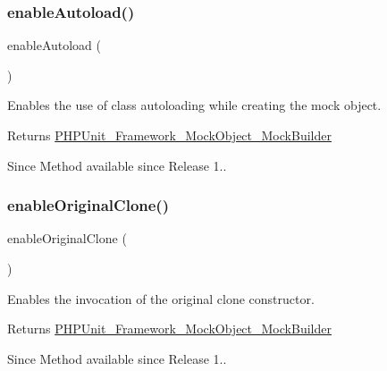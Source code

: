 \subsubsection{\texorpdfstring{enable\+Autoload()}{enableAutoload()}}
{\footnotesize\ttfamily enable\+Autoload (\begin{DoxyParamCaption}{ }\end{DoxyParamCaption})}

Enables the use of class autoloading while creating the mock object.

\begin{DoxyReturn}{Returns}
\mbox{\hyperlink{class_p_h_p_unit___framework___mock_object___mock_builder}{P\+H\+P\+Unit\+\_\+\+Framework\+\_\+\+Mock\+Object\+\_\+\+Mock\+Builder}}
\end{DoxyReturn}
\begin{DoxySince}{Since}
Method available since Release 1.. 
\end{DoxySince}
\mbox{\label{class_p_h_p_unit___framework___mock_object___mock_builder_ac06ee5b49cd8ae68cb7e072380593df8}} 
\subsubsection{\texorpdfstring{enable\+Original\+Clone()}{enableOriginalClone()}}
{\footnotesize\ttfamily enable\+Original\+Clone (\begin{DoxyParamCaption}{ }\end{DoxyParamCaption})}

Enables the invocation of the original clone constructor.

\begin{DoxyReturn}{Returns}
\mbox{\hyperlink{class_p_h_p_unit___framework___mock_object___mock_builder}{P\+H\+P\+Unit\+\_\+\+Framework\+\_\+\+Mock\+Object\+\_\+\+Mock\+Builder}}
\end{DoxyReturn}
\begin{DoxySince}{Since}
Method available since Release 1.. 
\end{DoxySince}
\mbox{\label{class_p_h_p_unit___framework___mock_object___mock_builder_af1b747910ca8a11783ac67cd942dbd53}} 
